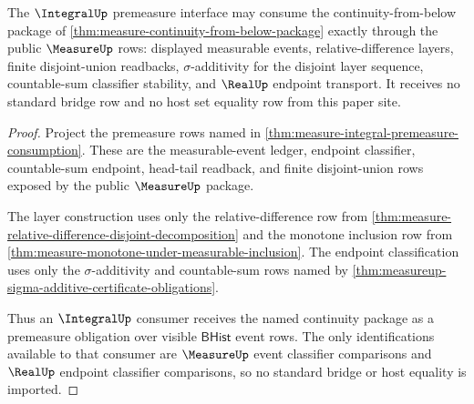 \begin{theorem}
\label{thm:measure-continuity-from-below-integral-scope}
The $\IntegralUp$ premeasure interface may consume the continuity-from-below
package of \autoref{thm:measure-continuity-from-below-package} exactly through
the public $\MeasureUp$ rows: displayed measurable events, relative-difference
layers, finite disjoint-union readbacks, $\sigma$-additivity for the disjoint
layer sequence, countable-sum classifier stability, and $\RealUp$ endpoint
transport. It receives no standard bridge row and no host set equality row from
this paper site.
\end{theorem}
\begin{proof}
Project the premeasure rows named in
\autoref{thm:measure-integral-premeasure-consumption}. These are the
measurable-event ledger, endpoint classifier, countable-sum endpoint,
head-tail readback, and finite disjoint-union rows exposed by the public
$\MeasureUp$ package.

The layer construction uses only the relative-difference row from
\autoref{thm:measure-relative-difference-disjoint-decomposition} and the
monotone inclusion row from
\autoref{thm:measure-monotone-under-measurable-inclusion}. The endpoint
classification uses only the $\sigma$-additivity and countable-sum rows named
by \autoref{thm:measureup-sigma-additive-certificate-obligations}.

Thus an $\IntegralUp$ consumer receives the named continuity package as a
premeasure obligation over visible $\mathsf{BHist}$ event rows. The only
identifications available to that consumer are $\MeasureUp$ event classifier
comparisons and $\RealUp$ endpoint classifier comparisons, so no standard
bridge or host equality is imported.
\end{proof}

